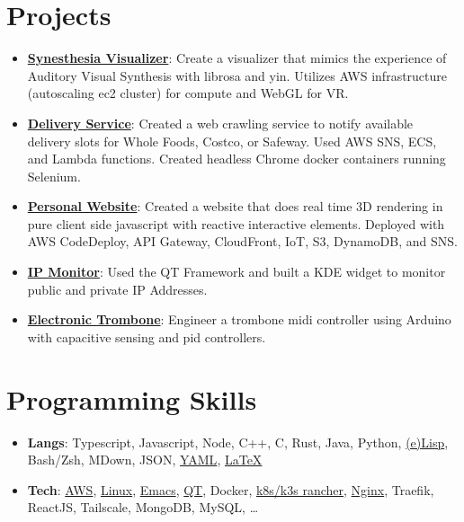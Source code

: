 \documentclass[letterpaper,11pt]{article}
\newcommand{\resumeItem}[2]{
	\item[]\small{
		\textbf{#1}{: #2 \vspace{-2pt}}
	}
}
\newcommand{\resumeSubHeadingListStart}{\begin{itemize}[leftmargin=1mm]}
\newcommand{\resumeSubHeadingListEnd}{\end{itemize}}
\begin{document}
\section{Projects}
\resumeSubHeadingListStart
\resumeItem{\href{https://github.com/sachiniyer/SynesthesiaVisualizer}{Synesthesia Visualizer}}
{Create a visualizer that mimics the experience of Auditory Visual Synthesis with librosa and yin. Utilizes AWS infrastructure (autoscaling ec2 cluster) for compute and WebGL for VR.}
\resumeItem{\href{https://github.com/sachiniyer/delivery-service}{Delivery Service}}
{Created a web crawling service to notify available delivery slots for Whole Foods, Costco, or Safeway. Used AWS SNS, ECS, and Lambda functions. Created headless Chrome docker containers running Selenium.}
\resumeItem{\href{https://sachiniyer.com}{Personal Website}}
{Created a website that does real time 3D rendering in pure client side javascript with reactive interactive elements. Deployed with AWS CodeDeploy, API Gateway, CloudFront, IoT, S3, DynamoDB, and SNS.}
\resumeItem{\href{https://github.com/sachiniyer/ip-monitor}{IP Monitor}}
{Used the QT Framework and built a KDE widget to monitor public and private IP Addresses.}
\resumeItem{\href{https://github.com/sachiniyer/Electric-Trombone}{Electronic Trombone}}
{Engineer a trombone midi controller using Arduino with capacitive sensing and pid controllers.}
\resumeSubHeadingListEnd

%
\section{Programming Skills}
\resumeSubHeadingListStart{}
\resumeItem{Langs}
{Typescript, Javascript, Node, C++, C, Rust, Java, Python, \href{https://github.com/sachiniyer/emacs/blob/old-config/.emacs}{(e)Lisp}, Bash/Zsh, MDown, JSON, \href{https://github.com/sachiniyer/control_display/blob/main/control_display_site/deployment.yaml}{YAML}, \href{https://github.com/sachiniyer/resume/blob/master/resume.tex}{\LaTeX}} %
\resumeItem{Tech}
{\href{https://www.credly.com/badges/ef46fdf4-2c55-474d-a963-9ee14107160f}{AWS}, \href{https://github.com/sachiniyer/resume/tree/master/environment}{Linux}, \href{https://github.com/sachiniyer/emacs}{Emacs}, \href{https://github.com/sachiniyer/ip-monitor}{QT}, Docker, \href{https://github.com/sachiniyer/cheap_portable_k3s/blob/main/README.pdf}{k8s/k3s rancher}, \href{https://github.com/sachiniyer/cheap_portable_k3s/blob/main/nginx.conf}{Nginx}, Traefik, ReactJS, Tailscale, MongoDB, MySQL, \ldots}
\resumeSubHeadingListEnd{}
\end{document}
